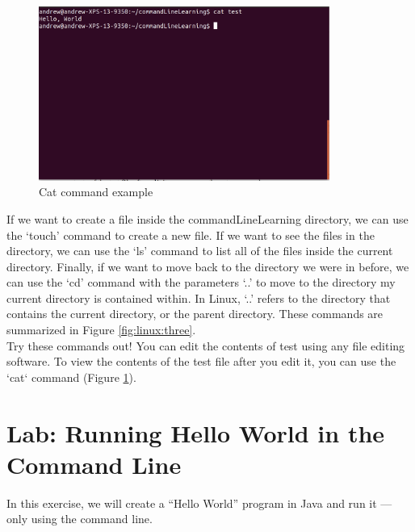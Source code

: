 \begin{figure}[ht]
	\centering
	\includegraphics[width=0.85\textwidth]{images/commandLineFour.png}
	\caption{Cat command example}
	\label{fig:linux:four}
\end{figure}

If we want to create a file inside the commandLineLearning directory, we can use the ‘touch’ command to create a new file. If we want to see the files in the directory, we can use the ‘ls’ command to list all of the files inside the current directory. Finally, if we want to move back to the directory we were in before, we can use the ‘cd’ command with the parameters ‘..’ to move to the directory my current directory is contained within. In Linux, ‘..’ refers to the directory that contains the current directory, or the parent directory. These commands are summarized in Figure \ref{fig:linux:three}. \\

Try these commands out! You can edit the contents of test using any file editing software. To view the contents of the test file after you edit it, you can use the `cat` command (Figure \ref{fig:linux:four}). \\


\section{Lab: Running Hello World in the Command Line}

In this exercise, we will create a ``Hello World'' program in Java and run it --- only using the command line.

